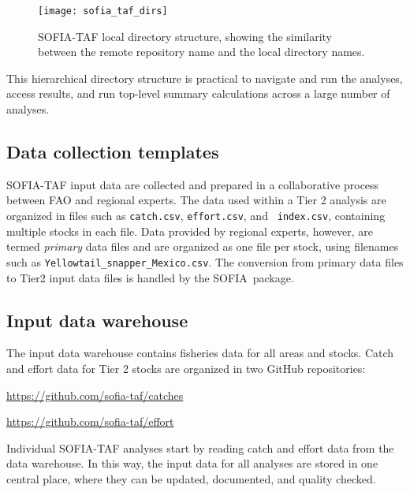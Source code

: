 \documentclass[12pt]{article}
\newcommand\blue[1]{\textcolor{darkblue}{#1}}
\newcommand\SOFIA{{\sf SOFIA}}
\begin{document}
\begin{figure}[htb]
  \begin{center}
    \texttt{[image: sofia\_taf\_dirs]}
    \vspace{1ex}
    \caption{SOFIA-TAF local directory structure, showing the similarity between
      the remote repository name and the local directory names.}
    \label{fig:sofia-taf-dirs}
  \end{center}
\end{figure}

\vspace{1ex}

This hierarchical directory structure is practical to navigate and run the
analyses, access results, and run top-level summary calculations across a large
number of analyses.

\subsection{Data collection templates}

SOFIA-TAF input data are collected and prepared in a collaborative process
between FAO and regional experts. The data used within a Tier 2 analysis are
organized in files such as {\tt catch.csv}, {\tt effort.csv}, and {\tt
  index.csv}, containing multiple stocks in each file. Data provided by regional
experts, however, are termed {\it primary} data files and are organized as one
file per stock, using filenames such as \verb|Yellowtail_snapper_Mexico.csv|.
The conversion from primary data files to Tier2 input data files is handled by
the \SOFIA\ package.

\subsection{Input data warehouse}

The input data warehouse contains fisheries data for all areas and stocks. Catch
and effort data for Tier 2 stocks are organized in two GitHub repositories:

\qquad\blue{\url{https://github.com/sofia-taf/catches}}

\qquad\blue{\url{https://github.com/sofia-taf/effort}}

Individual SOFIA-TAF analyses start by reading catch and effort data from the
data warehouse. In this way, the input data for all analyses are stored in one
central place, where they can be updated, documented, and quality checked.
\end{document}
